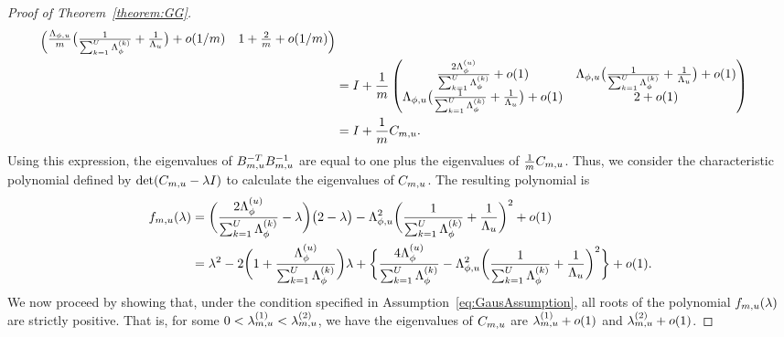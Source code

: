 \documentclass[12pt]{article}\usepackage[]{graphicx}\usepackage[]{xcolor}
\begin{document}
\begin{appendices}
\begin{proof}[Proof of Theorem~\ref{theorem:GG}]
\begin{align*}
\begin{pmatrix}
  \frac{\Lambda_{\phi, u}}{m} \big(\frac{1}{\sum_{k = 1}^U\Lambda^{(k)}_{\phi}} + \frac{1}{\Lambda_u}\big) + o(1/m) & 1 + \frac{2}{m} + o(1/m) \end{pmatrix} \\
  &= I + \frac{1}{m}\begin{pmatrix} \frac{2\Lambda^{(u)}_{\phi}}{\sum_{k = 1}^U\Lambda^{(k)}_{\phi}} + o(1) & \Lambda_{\phi, u} \big(\frac{1}{\sum_{k = 1}^U\Lambda^{(k)}_{\phi}} + \frac{1}{\Lambda_u}\big) + o(1)\\
  \Lambda_{\phi, u} \big(\frac{1}{\sum_{k = 1}^U\Lambda^{(k)}_{\phi}} + \frac{1}{\Lambda_u}\big) + o(1) & 2 + o(1) \end{pmatrix} \\
  &= I + \frac{1}{m}C_{m, u}.
\end{align*}
Using this expression, the eigenvalues of $B^{-T}_{m, u}B^{-1}_{m, u}$ are equal to one plus the eigenvalues of $\frac{1}{m}C_{m, u}$.
Thus, we consider the characteristic polynomial defined by $\det (C_{m, u} - \lambda I)$ to calculate the eigenvalues of $C_{m, u}$. The resulting polynomial is
\begin{align*}
f_{m, u}(\lambda) &=
  \bigg(
    \frac{2\Lambda^{(u)}_{\phi}}{\sum_{k = 1}^U\Lambda^{(k)}_{\phi}} - \lambda\bigg)
  \big(2 - \lambda\big) -
  \Lambda_{\phi, u}^2
  \bigg(
    \frac{1}{\sum_{k = 1}^U\Lambda^{(k)}_{\phi}} + \frac{1}{\Lambda_u}
  \bigg)^2 + o(1)
  \\
  &= \lambda^2 -
  2\bigg(
    1 + \frac{\Lambda^{(u)}_{\phi}}{\sum_{k = 1}^U\Lambda^{(k)}_{\phi}}
  \bigg)
  \lambda +
  \bigg\{
    \frac{4\Lambda^{(u)}_{\phi}}{\sum_{k = 1}^U\Lambda^{(k)}_{\phi}}
    - \Lambda_{\phi, u}^2
    \bigg(
      \frac{1}{\sum_{k = 1}^U\Lambda^{(k)}_{\phi}} + \frac{1}{\Lambda_u}
    \bigg)^2
  \bigg\} + o(1).
\end{align*}
We now proceed by showing that, under the condition specified in Assumption~\ref{eq:GausAssumption}, all roots of the polynomial $f_{m, u}(\lambda)$ are strictly positive.
That is, for some $0 < \lambda^{(1)}_{m, u} < \lambda^{(2)}_{m, u}$, we have the eigenvalues of $C_{m, u}$ are $\lambda^{(1)}_{m, u} + o(1)$ and $\lambda^{(2)}_{m, u} + o(1)$.


\end{proof}
\end{appendices}
\end{document}
